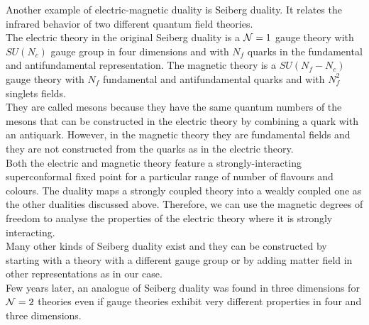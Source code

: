 Another example of electric-magnetic duality is Seiberg duality.
It relates the infrared behavior of two different quantum field theories.\\
The electric theory in the original Seiberg duality is a $\mathcal{N}=1$ gauge theory with $SU(N_c)$ gauge group in four dimensions and with $N_f$ quarks in the fundamental and antifundamental representation.
The magnetic theory is a $SU(N_f-N_c)$ gauge theory with $N_f$ fundamental and antifundamental quarks and with $N_f^2$ singlets fields. \\
They are called mesons because they have the same quantum numbers of the mesons that can be constructed in the electric theory by combining a quark with an antiquark. 
However, in the magnetic theory they are fundamental fields and they are not constructed from the quarks as in the electric theory.\\
Both the electric and magnetic theory feature a strongly-interacting superconformal  fixed point for a particular range of number of flavours and colours. 
The duality maps a strongly coupled theory into a weakly coupled one as the other dualities discussed above. 
Therefore, we can use the magnetic degrees of freedom to analyse the properties of the electric theory where it is strongly interacting.\\
Many other kinds of Seiberg duality exist and they can be constructed by starting with a theory with a different gauge group or by adding matter field in other representations as in our case.\\
Few years later, an analogue of Seiberg duality was found in three dimensions for $\mathcal{N}=2$ theories even if gauge theories exhibit very different properties in four and three dimensions.\\

